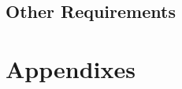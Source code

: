 \documentclass[11pt]{article}
\begin{document}
		\subsection{Other Requirements}

	\section{Appendixes}
	
\end{document}
